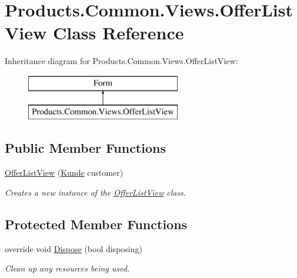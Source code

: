 \hypertarget{class_products_1_1_common_1_1_views_1_1_offer_list_view}{}\section{Products.\+Common.\+Views.\+Offer\+List\+View Class Reference}
\label{class_products_1_1_common_1_1_views_1_1_offer_list_view}
Inheritance diagram for Products.\+Common.\+Views.\+Offer\+List\+View\+:\begin{figure}[H]
\begin{center}
\leavevmode
\includegraphics[height=2.000000cm]{class_products_1_1_common_1_1_views_1_1_offer_list_view}
\end{center}
\end{figure}
\subsection*{Public Member Functions}
\begin{DoxyCompactItemize}
\item 
\hyperlink{class_products_1_1_common_1_1_views_1_1_offer_list_view_abd4d14a1d8c194f811196095cb9222f2}{Offer\+List\+View} (\hyperlink{class_products_1_1_model_1_1_entities_1_1_kunde}{Kunde} customer)
\begin{DoxyCompactList}\small\item\em Creates a new instance of the \hyperlink{class_products_1_1_common_1_1_views_1_1_offer_list_view}{Offer\+List\+View} class. \end{DoxyCompactList}\end{DoxyCompactItemize}
\subsection*{Protected Member Functions}
\begin{DoxyCompactItemize}
\item 
override void \hyperlink{class_products_1_1_common_1_1_views_1_1_offer_list_view_a31857063eafc24172415b20a9f785268}{Dispose} (bool disposing)
\begin{DoxyCompactList}\small\item\em Clean up any resources being used. \end{DoxyCompactList}\end{DoxyCompactItemize}
